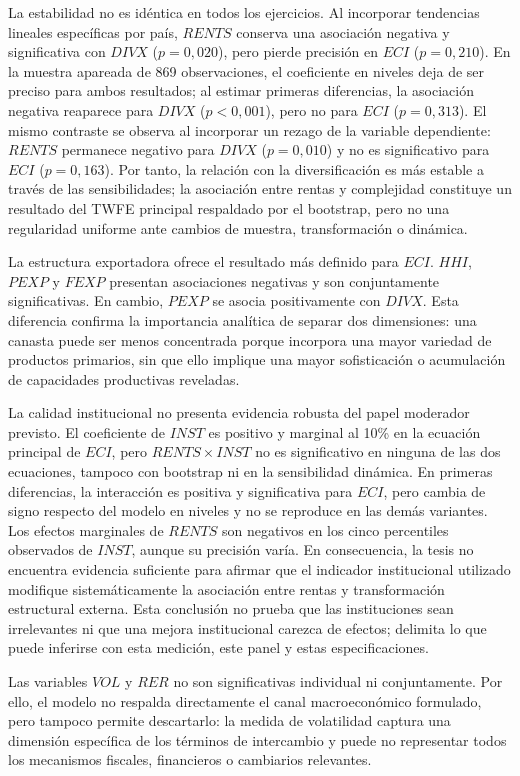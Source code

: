 \documentclass[../../TFM.tex]{subfiles}
\begin{document}
La estabilidad no es idéntica en todos los ejercicios. Al incorporar tendencias
lineales específicas por país, $RENTS$ conserva una asociación negativa y
significativa con $DIVX$ ($p=0,020$), pero pierde precisión en $ECI$
($p=0,210$). En la muestra apareada de 869 observaciones, el coeficiente en
niveles deja de ser preciso para ambos resultados; al estimar primeras
diferencias, la asociación negativa reaparece para $DIVX$ ($p<0,001$), pero no
para $ECI$ ($p=0,313$). El mismo contraste se observa al incorporar un rezago de
la variable dependiente: $RENTS$ permanece negativo para $DIVX$ ($p=0,010$) y no
es significativo para $ECI$ ($p=0,163$). Por tanto, la relación con la
diversificación es más estable a través de las sensibilidades; la asociación
entre rentas y complejidad constituye un resultado del TWFE principal respaldado
por el bootstrap, pero no una regularidad uniforme ante cambios de muestra,
transformación o dinámica.

La estructura exportadora ofrece el resultado más definido para $ECI$. $HHI$, $PEXP$ y
$FEXP$ presentan asociaciones negativas y son
conjuntamente significativas. En cambio, $PEXP$ se asocia positivamente con
$DIVX$. Esta diferencia confirma la importancia analítica de separar dos
dimensiones: una canasta puede ser menos concentrada porque incorpora una mayor
variedad de productos primarios, sin que ello implique una mayor sofisticación
o acumulación de capacidades productivas reveladas.

La calidad institucional no presenta evidencia robusta del papel moderador
previsto. El coeficiente de $INST$ es positivo y marginal al 10\% en la ecuación
principal de $ECI$, pero $RENTS\times INST$ no es significativo en ninguna de
las dos ecuaciones, tampoco con bootstrap ni en la sensibilidad dinámica. En
primeras diferencias, la interacción es positiva y significativa para $ECI$,
pero cambia de signo respecto del modelo en niveles y no se reproduce en las
demás variantes. Los efectos marginales de $RENTS$ son negativos en los cinco
percentiles observados de $INST$, aunque su precisión varía. En consecuencia,
la tesis no encuentra evidencia suficiente para afirmar que el indicador
institucional utilizado modifique sistemáticamente la asociación entre rentas y
transformación estructural externa. Esta conclusión no prueba que las
instituciones sean irrelevantes ni que una mejora institucional carezca de
efectos; delimita lo que puede inferirse con esta medición, este panel y estas
especificaciones.

Las variables $VOL$ y $RER$ no son significativas individual ni conjuntamente.
Por ello, el modelo no respalda directamente el canal macroeconómico formulado,
pero tampoco permite descartarlo: la medida de volatilidad captura una dimensión
específica de los términos de intercambio y puede no representar todos los
mecanismos fiscales, financieros o cambiarios relevantes.
\end{document}
